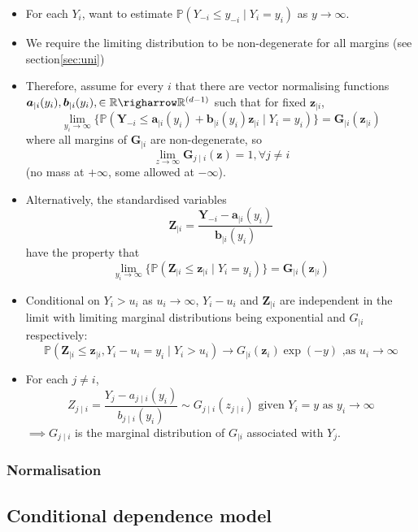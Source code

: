 \documentclass{article}
\begin{document}
\begin{itemize}
  \item For each $Y_i$, want to estimate $\mathbb{P}(Y_{-i} \le y_{-i} \mid Y_i = y_i)$ as $y \rightarrow \infty$. 
  \item We require the limiting distribution to be non-degenerate for all margins (see section\ref{sec:uni})
  \item Therefore, assume for every $i$ that there are vector normalising functions $\bm{a}_{\mid i}(y_i),\bm{b}_{\mid i}(y_i), \in \mathbb{R} \righarrow \mathbb{R}^{(d-1)}$ such that for fixed $\bm{z}_{\mid i}$, 
    \[
      \lim_{y_i \rightarrow \infty}\{\mathbb{P}(\bm{Y}_{-i} \le \bm{a}_{\mid i}(y_i) + \bm{b}_{\mid i}(y_i)\bm{z}_{\mid i} \mid Y_i = y_i)\} = \bm{G}_{\mid i}(\bm{z}_{\mid i})
    \] 
    where all margins of $\bm{G}_{\mid i}$ are non-degenerate, so 
    \[
    \lim_{z \rightarrow \infty}{\bm{G}_{j \mid i}(\bm{z})} = 1, \forall j \ne i
    \] (no mass at $+\infty$, some allowed at $-\infty$).
  \item Alternatively, the standardised variables
    \[
      \bm{Z}_{\mid i} = \frac{\bm{Y}_{-i} - \bm{a}_{\mid i}(y_i)} {\bm{b}_{\mid i}(y_i)}
    \]
    have the property that 
    \[
      \lim_{y_i \rightarrow \infty}\{\mathbb{P}(\bm{Z}_{\mid i} \le \bm{z}_{\mid i} \mid Y_i = y_i)\} = \bm{G}_{\mid i}(\bm{z}_{\mid i})
    \]
  \item Conditional on $Y_i > u_i$ as $u_i \rightarrow \infty$, $Y_i  - u_i$ and $\bm{Z}_{\mid i}$ are independent in the limit with limiting marginal distributions being exponential and $G_{\mid i}$ respectively:
    \[
      \mathbb{P}(\bm{Z}_{\mid i} \le \bm{z}_{\mid i}, Y_i - u_i = y_i \mid Y_i > u_i) \rightarrow G_{\mid i}(\bm{z}_i) \exp(-y) \text{ ,as } u_i \rightarrow \infty
    \]
  \item For each $j \ne i$, 
    \[
      Z_{j\mid i} = \frac{Y_j - a_{j\mid i}(y_i)}{b_{j\mid i}(y_i)} \sim G_{j\mid i}(z_{j\mid i}) \text { given } Y_i = y \text{ as } y_i \rightarrow \infty
    \]
    $\implies G_{j \mid i}$ is the marginal distribution of $G_{\mid i}$ associated with $Y_j$.
\end{itemize}

\subsubsection{Normalisation}

\subsection{Conditional dependence model}
\end{document}
